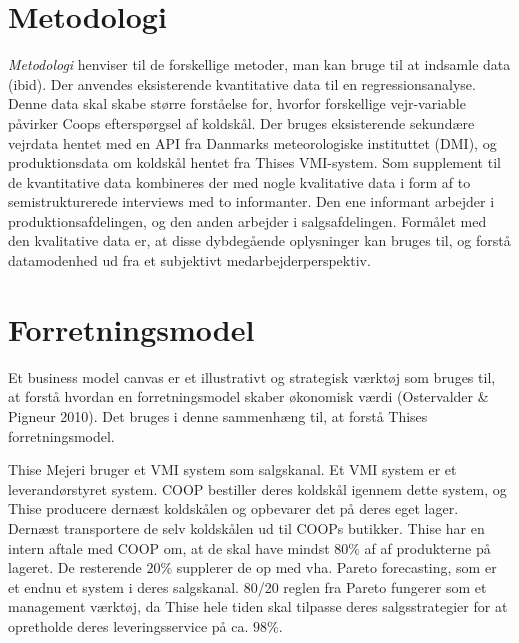 \documentclass[
  12pt,
  a4paper,
  DIV=11,
  numbers=noendperiod]{scrartcl}
\begin{document}
\hypertarget{metodologi}{%
\section{Metodologi}\label{metodologi}}

\emph{Metodologi} henviser til de forskellige metoder, man kan bruge til
at indsamle data (ibid). Der anvendes eksisterende kvantitative data til
en regressionsanalyse. Denne data skal skabe større forståelse for,
hvorfor forskellige vejr-variable påvirker Coops efterspørgsel af
koldskål. Der bruges eksisterende sekundære vejrdata hentet med en API
fra Danmarks meteorologiske instituttet (DMI), og produktionsdata om
koldskål hentet fra Thises VMI-system. Som supplement til de
kvantitative data kombineres der med nogle kvalitative data i form af to
semistrukturerede interviews med to informanter. Den ene informant
arbejder i produktionsafdelingen, og den anden arbejder i
salgsafdelingen. Formålet med den kvalitative data er, at disse
dybdegående oplysninger kan bruges til, og forstå datamodenhed ud fra et
subjektivt medarbejderperspektiv.

\hypertarget{forretningsmodel}{%
\section{Forretningsmodel}\label{forretningsmodel}}

Et business model canvas er et illustrativt og strategisk værktøj som
bruges til, at forstå hvordan en forretningsmodel skaber økonomisk værdi
(Ostervalder \& Pigneur 2010). Det bruges i denne sammenhæng til, at
forstå Thises forretningsmodel.

Thise Mejeri bruger et VMI system som salgskanal. Et VMI system er et
leverandørstyret system. COOP bestiller deres koldskål igennem dette
system, og Thise producere dernæst koldskålen og opbevarer det på deres
eget lager. Dernæst transportere de selv koldskålen ud til COOPs
butikker. Thise har en intern aftale med COOP om, at de skal have mindst
\(80\%\) af af produkterne på lageret. De resterende \(20\%\) supplerer
de op med vha. Pareto forecasting, som er et endnu et system i deres
salgskanal. 80/20 reglen fra Pareto fungerer som et management værktøj,
da Thise hele tiden skal tilpasse deres salgsstrategier for at
opretholde deres leveringsservice på ca. \(98\%\).
\end{document}
